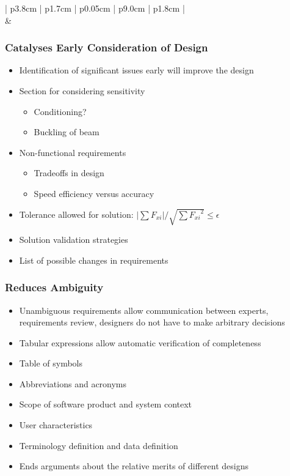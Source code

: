 \documentclass[t,12pt,numbers,fleqn]{beamer}
\begin{document}
\begin{frame}
{\begin{tabular}{| p{3.8cm} | p{1.7cm} | p{0.05cm} | p{9.0cm} | p{1.8cm} |}
 \\
 &  \\
\end{tabular} }
\end{frame}


\begin{frame}
\frametitle{Catalyses Early Consideration of Design}
\begin{itemize}
\item Identification of significant issues early will improve the design
\item Section for considering sensitivity
\begin{itemize}
\item Conditioning?
\item Buckling of beam
\end{itemize}
\item Non-functional requirements
\begin{itemize}
\item Tradeoffs in design
\item Speed efficiency versus accuracy
\end{itemize}
\item Tolerance allowed for solution: $|\sum{F_{xi}}| / \sqrt{\sum{F_{xi}}^2} \le \epsilon$
\item Solution validation strategies
\item List of possible changes in requirements
\end{itemize}
\end{frame}


\begin{frame}
\frametitle{Reduces Ambiguity}
\begin{itemize}
\item Unambiguous requirements allow communication between experts, requirements review, designers do not have to
make arbitrary decisions
\item Tabular expressions allow automatic verification of completeness
\item Table of symbols
\item Abbreviations and acronyms
\item Scope of software product and system context
\item User characteristics
\item Terminology definition and data definition
\item Ends arguments about the relative merits of different designs
\end{itemize}
\end{frame}
\end{document}

